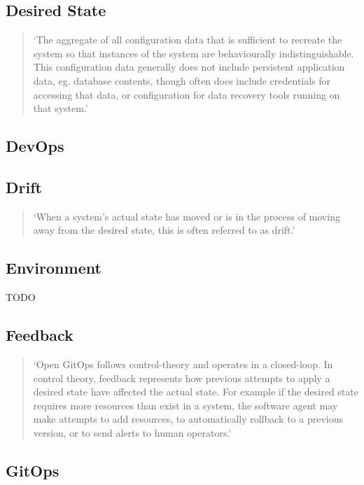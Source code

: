 \subsection*{Desired State}
\begin{quotation}
\noindent
\enquote*{The aggregate of all configuration data that is sufficient to recreate the system so that instances of the system are behaviourally indistinguishable. This configuration data generally does not include persistent application data, eg. database contents, though often does include credentials for accessing that data, or configuration for data recovery tools running on that system.}
\autocite{gitopsGlossary}
\end{quotation}

\subsection*{DevOps}

\subsection*{Drift}
\begin{quotation}
\noindent
\enquote*{When a system's actual state has moved or is in the process of moving away from the desired state, this is often referred to as drift.}
\autocite{gitopsGlossary}
\end{quotation}

\subsection*{Environment}
TODO

\subsection*{Feedback}
\begin{quotation}
	\noindent
	\enquote*{Open GitOps follows control-theory and operates in a closed-loop. In control theory, feedback represents how previous attempts to apply a desired state have affected the actual state. For example if the desired state requires more resources than exist in a system, the software agent may make attempts to add resources, to automatically rollback to a previous version, or to send alerts to human operators.}
	\autocite{gitopsGlossary}
\end{quotation}

\subsection*{GitOps}

